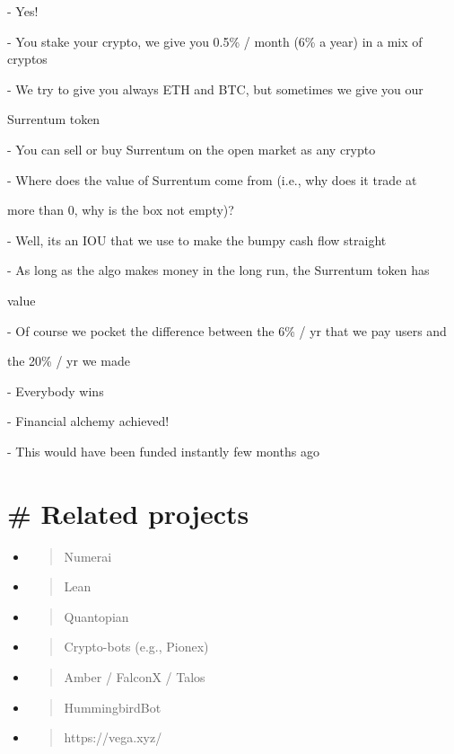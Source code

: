 \documentclass[11pt, reqno]{amsart}
\begin{document}
- Yes!

- You stake your crypto, we give you 0.5\% / month (6\% a year) in a mix
of cryptos

- We try to give you always ETH and BTC, but sometimes we give you our

Surrentum token

- You can sell or buy Surrentum on the open market as any crypto

- Where does the value of Surrentum come from (i.e., why does it trade
at

more than 0, why is the box not empty)?

- Well, it\textquotesingle s an IOU that we use to make the bumpy cash
flow straight

- As long as the algo makes money in the long run, the Surrentum token
has

value

- Of course we pocket the difference between the 6\% / yr that we pay
users and

the 20\% / yr we made

- Everybody wins

- Financial alchemy achieved!

- This would have been funded instantly few months ago

\hypertarget{related-projects}{%
\section{\# Related projects}\label{related-projects}}

\begin{itemize}
\item
  \begin{quote}
  Numerai
  \end{quote}
\item
  \begin{quote}
  Lean
  \end{quote}
\item
  \begin{quote}
  Quantopian
  \end{quote}
\item
  \begin{quote}
  Crypto-bots (e.g., Pionex)
  \end{quote}
\item
  \begin{quote}
  Amber / FalconX / Talos
  \end{quote}
\item
  \begin{quote}
  HummingbirdBot
  \end{quote}
\item
  \begin{quote}
  https://vega.xyz/
  \end{quote}
\end{itemize}
\end{document}
